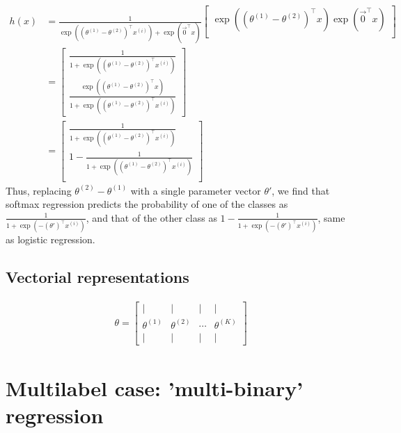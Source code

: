 \begin{align} h(x) &= \frac{1}{ \exp( (\theta^{(1)}-\theta^{(2)})^\top x^{(i)} ) + \exp(\vec{0}^\top x) } \begin{bmatrix} \exp( (\theta^{(1)}-\theta^{(2)})^\top x ) \exp( \vec{0}^\top x ) \\ \end{bmatrix} \\ &= \begin{bmatrix} \frac{1}{ 1 + \exp( (\theta^{(1)}-\theta^{(2)})^\top x^{(i)} ) } \\ \frac{\exp( (\theta^{(1)}-\theta^{(2)})^\top x )}{ 1 + \exp( (\theta^{(1)}-\theta^{(2)})^\top x^{(i)} ) } \end{bmatrix} \\ &= \begin{bmatrix} \frac{1}{ 1 + \exp( (\theta^{(1)}-\theta^{(2)})^\top x^{(i)} ) } \\ 1 - \frac{1}{ 1 + \exp( (\theta^{(1)}-\theta^{(2)})^\top x^{(i)} ) } \\ \end{bmatrix} 
\end{align}
Thus, replacing $\theta^{(2)}-\theta^{(1)}$ with a single parameter vector $\theta'$, we find that softmax regression predicts the probability of one of the classes as $\frac{1}{ 1 + \exp(- (\theta')^\top x^{(i)} ) }$, and that of the other class as $1 - \frac{1}{ 1 + \exp(- (\theta')^\top x^{(i)} ) }$, same as logistic regression.



\subsection{Vectorial representations}
\begin{align}
	\theta = \left[\begin{array}{cccc}| & | & | & | \\ \theta^{(1)} & \theta^{(2)} & \cdots & \theta^{(K)} \\ | & | & | & | \end{array}\right]
\end{align}












\section{Multilabel case: 'multi-binary' regression}

